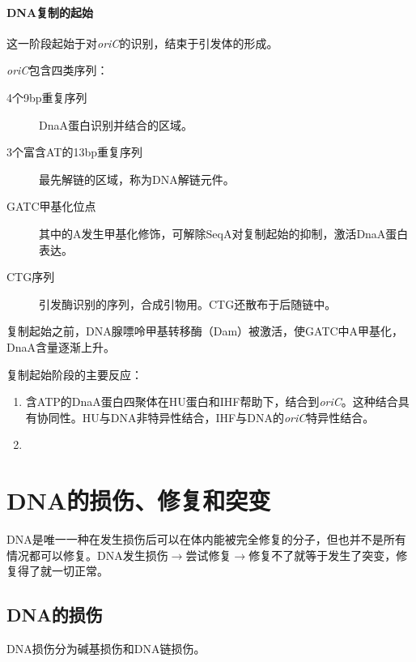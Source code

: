 \paragraph{DNA复制的起始}

这一阶段起始于对\textit{oriC}的识别，结束于引发体的形成。

\textit{oriC}包含四类序列：

\begin{description}
	\item[4个9bp重复序列] DnaA蛋白识别并结合的区域。
	\item[3个富含AT的13bp重复序列] 最先解链的区域，称为DNA解链元件。
	\item[GATC甲基化位点] 其中的A发生甲基化修饰，可解除SeqA对复制起始的抑制，激活DnaA蛋白表达。
	\item[CTG序列] 引发酶识别的序列，合成引物用。CTG还散布于后随链中。
\end{description}

复制起始之前，DNA腺嘌呤甲基转移酶（Dam）被激活，使GATC中A甲基化，DnaA含量逐渐上升。

复制起始阶段的主要反应：

\begin{enumerate}
	\item 含ATP的DnaA蛋白四聚体在HU蛋白和IHF帮助下，结合到\textit{oriC}。这种结合具有协同性。HU与DNA非特异性结合，IHF与DNA的\textit{oriC}特异性结合。
	\item
\end{enumerate}





\section{DNA的损伤、修复和突变}

DNA是唯一一种在发生损伤后可以在体内能被完全修复的分子，但也并不是所有情况都可以修复。DNA发生损伤$\longrightarrow$尝试修复$\longrightarrow$修复不了就等于发生了突变，修复得了就一切正常。

\subsection{DNA的损伤}

DNA损伤分为碱基损伤和DNA链损伤。

